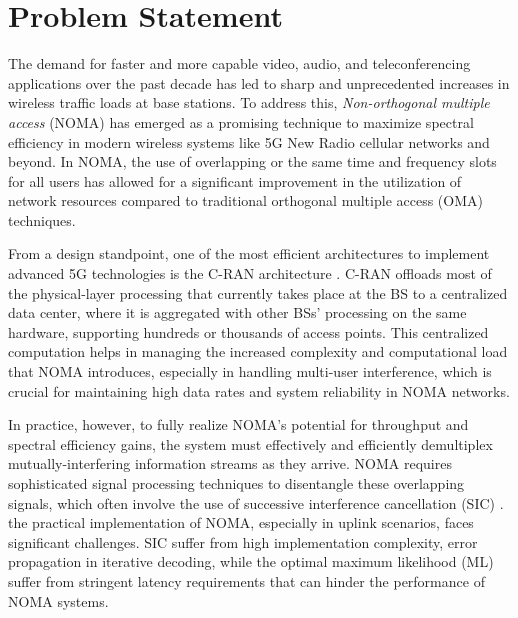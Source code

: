 \section{Problem Statement}\label{problem-statement}


The demand for faster and more capable video, audio, and teleconferencing applications over the past decade has led to sharp and unprecedented increases in wireless traffic loads at base stations. To address this, \textit{Non-orthogonal multiple access} (NOMA) has emerged as a promising technique to maximize spectral efficiency in modern wireless systems like 5G New Radio cellular networks and beyond. In NOMA, the use of overlapping or the same time and frequency slots for all users has allowed for a significant improvement in the utilization of network resources compared to traditional orthogonal multiple access (OMA) techniques.

From a design standpoint, one of the most efficient architectures to implement advanced 5G technologies is the C-RAN architecture \cite{cran1}. C-RAN offloads most of the physical-layer processing that currently takes place at the BS to a centralized data
center, where it is aggregated with other BSs’ processing on the same hardware, supporting hundreds or thousands of access points. This centralized computation helps in managing the increased complexity and computational load that NOMA introduces, especially in handling multi-user interference, which is crucial for maintaining high data rates and system reliability in NOMA networks.

In practice, however, to fully realize NOMA's potential for throughput and spectral efficiency gains, the system must effectively and efficiently demultiplex mutually-interfering information streams as they arrive. NOMA requires sophisticated signal processing techniques to disentangle these overlapping signals, which often involve the use of successive interference cancellation (SIC) \cite{liu2020noma}. the practical implementation of NOMA, especially in uplink scenarios, faces significant challenges. SIC suffer from high implementation complexity, error propagation in iterative decoding, while the optimal maximum likelihood (ML) suffer from stringent latency requirements that can hinder the performance of NOMA systems.


